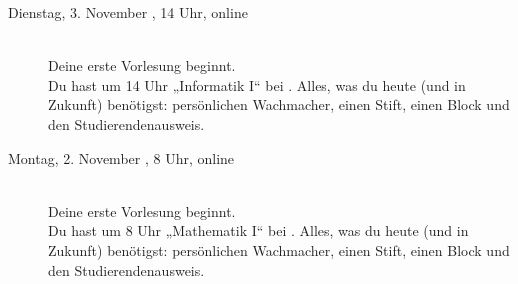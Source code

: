 \begin{description}
\ifbachelor
    \iflehramt
        \item[Dienstag, 3. November \YEAR, 14 Uhr, online]\ \\
            Deine erste Vorlesung beginnt. \\
            Du hast um 14 Uhr „Informatik I“ bei \Infoprof.
            Alles, was du heute (und in Zukunft) benötigst: persönlichen Wachmacher, einen Stift, einen Block und den Studierendenausweis.

    \else
        \item[Montag, 2. November \YEAR, 8 Uhr, online]\ \\
            Deine erste Vorlesung beginnt. \\
            Du hast um 8 Uhr „Mathematik I“ bei \Matheprof.
            Alles, was du heute (und in Zukunft) benötigst: persönlichen Wachmacher, einen Stift, einen Block und den Studierendenausweis.

    \fi
\fi





\end{description}
